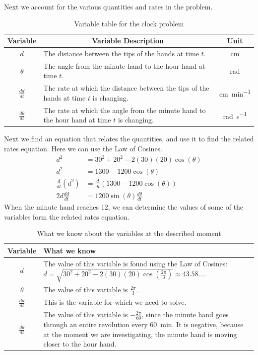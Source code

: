 \documentclass[10pt,oneside,]{book}
\theoremstyle{plain}
\theoremstyle{definition}
\numberwithin{equation}{section}
\newcommand{\fe}[2]{#1\mathopen{}\left(#2\right)\mathclose{}}
\newcommand{\lz}[2]{\frac{d#1}{d#2}}
\newcommand{\lzoo}[2]{{\frac{d}{d#1}}{\left(#2\right)}}
\begin{document}
\par
Next we account for the various quantities and rates in the problem.%
\begin{table}
\centering
\caption{Variable table for the clock problem\label{table-41}}
\begin{tabular}{cp{3.5in}c}
\toprule
Variable&\multicolumn{1}{c}{Variable Description}&Unit\\
\midrule
\(d\)&The distance between the tips of the hands at time \(t\).&\si{\centi\meter}\\
\midrule
\(\theta\)&The angle from the minute hand to the hour hand at time \(t\).&\si{\radian}\\
\midrule
\(\lz{d}{t}\)&The rate at which the distance between the tips of the hands at time \(t\) is changing.&\si{\centi\meter\per\minute}\\
\midrule
\(\lz{\theta}{t}\)&The rate at which the angle from the minute hand to the hour hand at time \(t\) is changing.&\si{\radian\per\second}\\
\bottomrule
\end{tabular}
\end{table}
\par
Next we find an equation that relates the quantities, and use it to find the related rates equation. Here we can use the Law of Cosines.\begin{align*}
d^2&=30^2+20^2-2(30)(20)\fe{\cos}{\theta}\\
d^2&=1300-1200\fe{\cos}{\theta}\\
\lzoo{t}{d^2}&=\lzoo{t}{1300-1200\fe{\cos}{\theta}}\\
2d\lz{d}{t}&=1200\fe{\sin}{\theta}\lz{\theta}{t}
\end{align*}When the minute hand reaches 12, we can determine the values of some of the variables form the related rates equation.%
\begin{table}
\centering
\caption{What we know about the variables at the described moment\label{table-42}}
\begin{tabular}{cp{4in}}
\toprule
Variable&What we know\\
\midrule
\(d\)&The value of this variable is found using the Law of Cosines: \(d=\sqrt{30^2+20^2-2(30)(20)\fe{\cos}{\frac{2\pi}{3}}}\approx43.58\ldots\).\\
\midrule
\(\theta\)&The value of this variable is \(\frac{2\pi}{3}\).\\
\midrule
\(\lz{d}{t}\)&This is the variable for which we need to solve.\\
\midrule
\(\lz{\theta}{t}\)&The value of this variable is \(-\frac{2\pi}{60}\), since the minute hand goes through an entire revolution every \SI{60}{\minute}. It is negative, because at the moment we are investigating, the minute hand is moving closer to the hour hand.\\
\bottomrule
\end{tabular}
\end{table}
\end{document}
